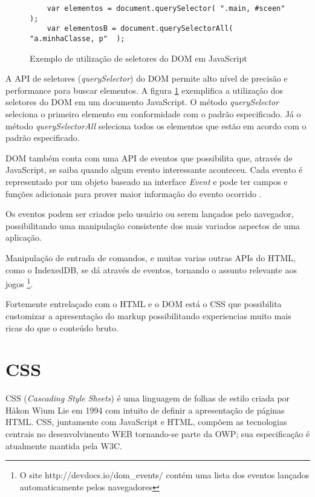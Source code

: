 \begin{figure}
\centering
\begin{verbatim}
    var elementos = document.querySelector( ".main, #sceen"  );
    var elementosB = document.querySelectorAll( "a.minhaClasse, p"  );
\end{verbatim}
\caption{Exemplo de utilização de seletores do DOM em JavaScript}
\label{fig:selectorsSample}
\end{figure}

A API de seletores (\textit{querySelector}) do DOM permite alto
nível de precisão e performance para buscar elementos. A figura
\ref{fig:selectorsSample} exemplifica a utilização dos seletores
do DOM em um documento JavaScript. O método \textit{querySelector}
seleciona o primeiro elemento em conformidade com o padrão
especificado. Já o método \textit{querySelectorAll} seleciona todos os
elementos que estão em acordo com o padrão especificado.

DOM também conta com uma API de eventos que possibilita que, através
de JavaScript, se saiba quando algum evento interessante aconteceu.
Cada evento é representado por um objeto baseado na interface
\textit{Event} e pode ter campos e funções adicionais para prover
maior informação do evento ocorrido \autocite{devdocs}.

Os eventos podem ser criados pelo usuário ou serem lançados pelo
navegador, possibilitando uma manipulação consistente dos mais
variados aspectos de uma aplicação.

Manipulação de entrada de comandos, e muitas varias outras APIs do
HTML, como o IndexedDB, se dá através de eventos, tornando o assunto
relevante aos jogos \footnote{O site http://devdocs.io/dom\_events/
contém uma lista dos eventos lançados automaticamente pelos
navegadores}.

Fortemente entrelaçado com o HTML e o DOM está o CSS que possibilita
customizar a apresentação do markup possibilitando experiencias muito
mais ricas do que o conteúdo bruto.
\section{CSS}
CSS (\textit{Cascading Style Sheets}) é uma linguagem de folhas de
estilo criada por Håkon Wium Lie em 1994 com intuito de definir a
apresentação de páginas HTML. CSS, juntamente com JavaScript e HTML,
compõem as tecnologias centrais no desenvolvimento WEB tornando-se
parte da OWP; sua especificação é atualmente mantida pela W3C.

